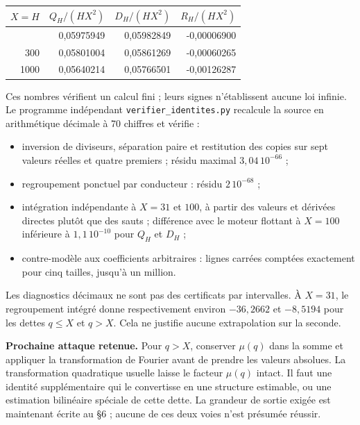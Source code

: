 \documentclass[
  11pt,
  a4paper,
]{article}
\providecommand{\tightlist}{%
  \setlength{\itemsep}{0pt}\setlength{\parskip}{0pt}}
\begin{document}
\begin{longtable}[]{@{}rrrr@{}}
\toprule\noalign{}
\(X=H\) & \(Q_H/(HX^2)\) & \(D_H/(HX^2)\) & \(R_H/(HX^2)\) \\
\midrule\noalign{}
\endhead
\bottomrule\noalign{}
\endlastfoot
100 & 0,05975949 & 0,05982849 & -0,00006900 \\
300 & 0,05801004 & 0,05861269 & -0,00060265 \\
1000 & 0,05640214 & 0,05766501 & -0,00126287 \\
\end{longtable}

Ces nombres vérifient un calcul fini ; leurs signes n'établissent aucune
loi infinie. Le programme indépendant \texttt{verifier\_identites.py}
recalcule la source en arithmétique décimale à 70 chiffres et vérifie :

\begin{itemize}
\tightlist
\item
  inversion de diviseurs, séparation paire et restitution des copies sur
  sept valeurs réelles et quatre premiers ; résidu maximal
  \(3,04\,10^{-66}\) ;
\item
  regroupement ponctuel par conducteur : résidu \(2\,10^{-68}\) ;
\item
  intégration indépendante à \(X=31\) et \(100\), à partir des valeurs
  et dérivées directes plutôt que des sauts ; différence avec le moteur
  flottant à \(X=100\) inférieure à \(1,1\,10^{-10}\) pour \(Q_H\) et
  \(D_H\) ;
\item
  contre-modèle aux coefficients arbitraires : lignes carrées comptées
  exactement pour cinq tailles, jusqu'à un million.
\end{itemize}

Les diagnostics décimaux ne sont pas des certificats par intervalles. À
\(X=31\), le regroupement intégré donne respectivement environ
\(-36,2662\) et \(-8,5194\) pour les dettes \(q\le X\) et \(q>X\). Cela
ne justifie aucune extrapolation sur la seconde.

\textbf{Prochaine attaque retenue.} Pour \(q>X\), conserver \(\mu(q)\)
dans la somme et appliquer la transformation de Fourier avant de prendre
les valeurs absolues. La transformation quadratique usuelle laisse le
facteur \(\mu(q)\) intact. Il faut une identité supplémentaire qui le
convertisse en une structure estimable, ou une estimation bilinéaire
spéciale de cette dette. La grandeur de sortie exigée est maintenant
écrite au §6 ; aucune de ces deux voies n'est présumée réussir.
\end{document}
